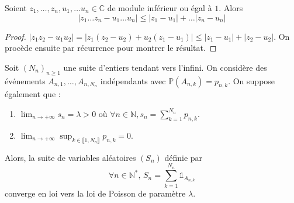






  \begin{lemma}
    \label{theoreme-des-evenements-rares-de-poisson-1}
    Soient $z_1, \dots, z_n, u_1, \dots u_n \in \mathbb{C}$ de module inférieur ou égal à $1$. Alors
    \[ |z_1 \dots z_n - u_1 \dots u_n| \leq |z_1-u_1| + \dots |z_n - u_n| \]
  \end{lemma}

  \begin{proof}
    $|z_1 z_2 - u_1 u_2| = |z_1(z_2 - u_2) + u_2(z_1 - u_1)| \leq |z_1 - u_1| + |z_2 - u_2|$. On procède ensuite par récurrence pour montrer le résultat.
  \end{proof}


  \begin{theorem}
    Soit $(N_n)_{n \geq 1}$ une suite d'entiers tendant vers l'infini. On considère des événements $A_{n,1}, \dots, A_{n,N_n}$ indépendants avec $\mathbb{P}(A_{n,k}) = p_{n,k}$. On suppose également que :
    \begin{enumerate}[label={\bfseries(\roman*)}]
      \item $\lim_{n \rightarrow +\infty} s_n = \lambda > 0$ où $\forall n \in \mathbb{N}, s_n = \sum_{k=1}^{N_n} p_{n,k}$.
      \item $\lim_{n \rightarrow +\infty} \sup_{k \in \llbracket 1, N_n \rrbracket} p_{n,k} = 0$.
    \end{enumerate}
    Alors, la suite de variables aléatoires $(S_n)$ définie par
    \[ \forall n \in \mathbb{N}^*, \, S_n = \sum_{k=1}^{N_n} \mathbb{1}_{A_{n,k}} \]
    converge en loi vers la loi de Poisson de paramètre $\lambda$.
  \end{theorem}

